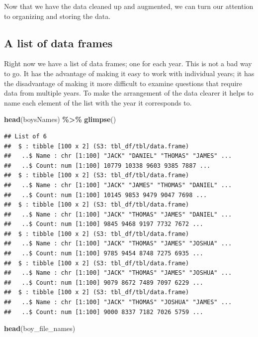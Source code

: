 \documentclass[
]{book}
\newenvironment{Shaded}{\begin{snugshade}}{\end{snugshade}}
\newcommand{\KeywordTok}[1]{\textcolor[rgb]{0.13,0.29,0.53}{\textbf{#1}}}
\newcommand{\NormalTok}[1]{#1}
\newcommand{\OperatorTok}[1]{\textcolor[rgb]{0.81,0.36,0.00}{\textbf{#1}}}
\newcommand{\StringTok}[1]{\textcolor[rgb]{0.31,0.60,0.02}{#1}}
\begin{document}
Now that we have the data cleaned up and augmented, we can turn our attention to organizing and storing the data.

\hypertarget{a-list-of-data-frames}{%
\subsection{A list of data frames}\label{a-list-of-data-frames}}

Right now we have a list of data frames; one for each year. This is not a bad way to go. It has the advantage of making it easy to work with individual years; it has the disadvantage of making it more difficult to examine questions that require data from multiple years. To make the arrangement of the data clearer it helps to name each element of the list with the year it corresponds to.

\begin{Shaded}
\begin{Highlighting}[]
\KeywordTok{head}\NormalTok{(boysNames) }\OperatorTok{\%\textgreater{}\%}\StringTok{ }\KeywordTok{glimpse}\NormalTok{()}
\end{Highlighting}
\end{Shaded}

\begin{verbatim}
## List of 6
##  $ : tibble [100 x 2] (S3: tbl_df/tbl/data.frame)
##   ..$ Name : chr [1:100] "JACK" "DANIEL" "THOMAS" "JAMES" ...
##   ..$ Count: num [1:100] 10779 10338 9603 9385 7887 ...
##  $ : tibble [100 x 2] (S3: tbl_df/tbl/data.frame)
##   ..$ Name : chr [1:100] "JACK" "JAMES" "THOMAS" "DANIEL" ...
##   ..$ Count: num [1:100] 10145 9853 9479 9047 7698 ...
##  $ : tibble [100 x 2] (S3: tbl_df/tbl/data.frame)
##   ..$ Name : chr [1:100] "JACK" "THOMAS" "JAMES" "DANIEL" ...
##   ..$ Count: num [1:100] 9845 9468 9197 7732 7672 ...
##  $ : tibble [100 x 2] (S3: tbl_df/tbl/data.frame)
##   ..$ Name : chr [1:100] "JACK" "THOMAS" "JAMES" "JOSHUA" ...
##   ..$ Count: num [1:100] 9785 9454 8748 7275 6935 ...
##  $ : tibble [100 x 2] (S3: tbl_df/tbl/data.frame)
##   ..$ Name : chr [1:100] "JACK" "THOMAS" "JAMES" "JOSHUA" ...
##   ..$ Count: num [1:100] 9079 8672 7489 7097 6229 ...
##  $ : tibble [100 x 2] (S3: tbl_df/tbl/data.frame)
##   ..$ Name : chr [1:100] "JACK" "THOMAS" "JOSHUA" "JAMES" ...
##   ..$ Count: num [1:100] 9000 8337 7182 7026 5759 ...
\end{verbatim}

\begin{Shaded}
\begin{Highlighting}[]
\KeywordTok{head}\NormalTok{(boy\_file\_names)}
\end{Highlighting}
\end{Shaded}
\end{document}
